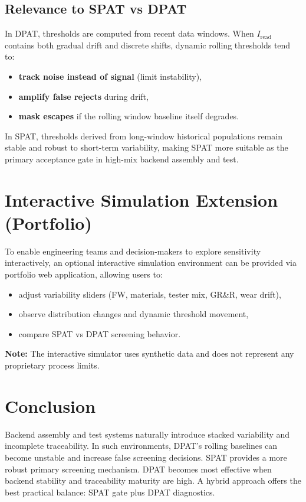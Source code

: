 \documentclass[11pt,a4paper]{article}
\begin{document}
	\subsection{Relevance to SPAT vs DPAT}
	In DPAT, thresholds are computed from recent data windows.
	When $I_{\text{read}}$ contains both gradual drift and discrete shifts, dynamic rolling thresholds tend to:
	\begin{itemize}[leftmargin=1.2em]
		\item \textbf{track noise instead of signal} (limit instability),
		\item \textbf{amplify false rejects} during drift,
		\item \textbf{mask escapes} if the rolling window baseline itself degrades.
	\end{itemize}
	
	In SPAT, thresholds derived from long-window historical populations remain stable and robust to short-term variability,
	making SPAT more suitable as the primary acceptance gate in high-mix backend assembly and test.
	
	
	
	\section{Interactive Simulation Extension (Portfolio)}
	
	To enable engineering teams and decision-makers to explore sensitivity interactively, an optional
	interactive simulation environment can be provided via portfolio web application, allowing users to:
	\begin{itemize}[leftmargin=1.2em]
		\item adjust variability sliders (FW, materials, tester mix, GR\&R, wear drift),
		\item observe distribution changes and dynamic threshold movement,
		\item compare SPAT vs DPAT screening behavior.
	\end{itemize}
	
	\textbf{Note:} The interactive simulator uses synthetic data and does not represent any proprietary process limits.
	
	\section{Conclusion}
	Backend assembly and test systems naturally introduce stacked variability and incomplete traceability.
	In such environments, DPAT’s rolling baselines can become unstable and increase false screening decisions.
	SPAT provides a more robust primary screening mechanism. DPAT becomes most effective when backend stability
	and traceability maturity are high. A hybrid approach offers the best practical balance: SPAT gate plus DPAT diagnostics.
	
\end{document}
